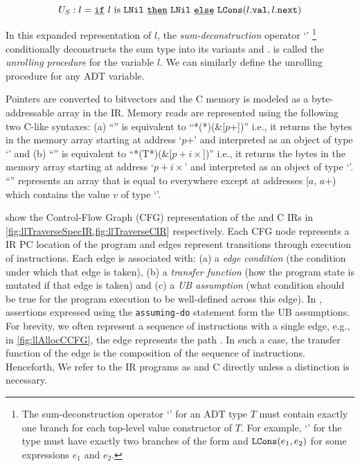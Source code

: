 \begin{equation}
\label{eqn:specDeconstruct}
U_S: l = \underline{\tt if}\ l\ \mathrm{is}\ {\tt LNil} \  \underline{\tt then}\ {\tt LNil} \  \underline{\tt else}\ {\tt LCons}(l.{{{\tt val}}}, l.{{{\tt next}}})
\end{equation}

In this expanded representation of $l$,
the {\em sum-deconstruction} operator `\sumDtor{}'
\footnote{The sum-deconstruction operator `\sumDtor{}' for an ADT
type $T$ must contain exactly one branch for each top-level value constructor of $T$.
For example, `\sumDtor{}' for the  type must have exactly two branches
of the form  and ${\tt LCons}(e_1,e_2)$ for some expressions $e_1$ and $e_2$.}
conditionally deconstructs the sum type into its variants  and .
 is called the {\em unrolling procedure} for the  variable $l$.
We can similarly define the unrolling procedure for any ADT variable.

Pointers are converted to bitvectors and the C memory 
is modeled as a byte-addressable array \mem{} in the IR.
Memory reads are represented using the following two C-like syntaxes:
(a) ``'' is equivalent to ``*(*)(\&\mem{}[$p$+])''
i.e., it returns the bytes in the memory array \mem{} starting at address `$p$+'
and interpreted as an object of type `' and
(b) ``'' is equivalent to ``*(T*)(\&\mem{}[$p+i\times$])''
i.e., it returns the bytes in the memory array \mem{} starting at address `$p+i\times$'
and interpreted as an object of type `'.
``'' represents an array that is equal to \mem{} everywhere except at addresses
[$a$, $a$+) which contains the value $v$ of type `'.

 show the Control-Flow Graph (CFG) representation
of the \SpecL{} and C IRs in \cref{fig:llTraverseSpecIR,fig:llTraverseCIR} respectively.
Each CFG node represents a IR PC location of the program and edges represent
transitions through execution of instructions.
Each edge is associated with:
(a) a {\em edge condition} (the condition under which that edge is taken),
(b) a {\em transfer function} (how the program state is mutated if that edge is taken) and
(c) a {\em UB assumption} (what condition should be true for the program execution
to be well-defined across this edge).
In \SpecL{}, assertions expressed using the {\tt assuming-do} statement
form the UB assumptions.
For brevity, we often represent a sequence of instructions with a single edge, e.g.,
in \cref{fig:llAllocCCFG}, the edge  represents the path .
In such a case, the transfer function of the edge is the composition of the sequence of instructions.
Henceforth, We refer to the IR programs as \SpecL{} and C directly unless a distinction is necessary.

